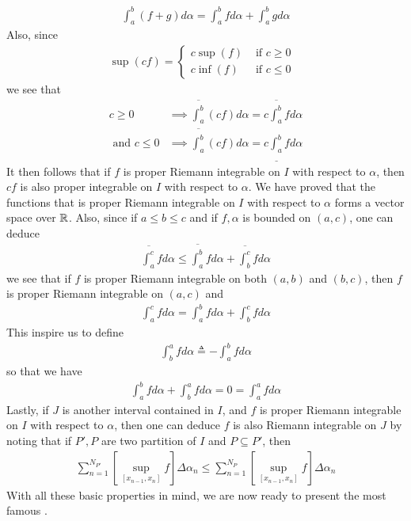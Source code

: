 \documentclass{report}
\begin{document}
\begin{mdframed}
\begin{align*}
\int_a^b (f+g)d\alpha = \int_a^b fd\alpha + \int_a^b gd\alpha 
\end{align*}
Also, since 
\begin{align*}
\sup  (cf)=\begin{cases}
  c\sup (f) & \text{ if $c\geq 0$ }\\
  c\inf (f)& \text{ if $c\leq 0$ }
\end{cases}
\end{align*}
we see that 
\begin{align*}
  c\geq 0 &\implies  \overline{\int_a^b}(cf)d\alpha = c\overline{\int_a^b}fd\alpha   \\
  \text{ and }c\leq 0&\implies  \overline{\int_a^b}(cf)d\alpha = c\underline{\int_a^b}fd\alpha  
\end{align*}
It then follows that if $f$ is proper Riemann integrable on $I$ with respect to $\alpha $, then $cf$ is also proper integrable on  $I$ with respect to  $\alpha $. We have proved that the functions that is proper Riemann integrable on $I$  with respect to $\alpha $ forms a vector space over $\mathbb{R}$. Also, since if $a\leq b\leq c$ and if  $f,\alpha $ is bounded on  $(a,c)$, one can deduce 
\begin{align*}
\overline{\int_a^c}fd\alpha \leq \overline{\int_a^b}fd\alpha  + \overline{\int_b^c}fd\alpha 
\end{align*}
we see that if $f$ is proper Riemann integrable on both  $(a,b)$ and $(b,c)$, then $f$ is proper Riemann integrable on $(a,c)$ and 
\begin{align*}
\int_a^c fd\alpha = \int_a^b fd\alpha + \int_b^c fd\alpha 
\end{align*}
This inspire us to define 
\begin{align*}
\int_b^a fd\alpha \triangleq -\int_a^b fd\alpha 
\end{align*}
so that we have 
\begin{align*}
\int_a^bfd\alpha +\int_b^a fd\alpha = 0= \int_a^a fd\alpha 
\end{align*}
Lastly, if $J$ is another interval contained in  $I$, and  $f$ is proper Riemann integrable on $I$ with respect to $\alpha$, then one can deduce $f$ is also Riemann integrable on $J$ by noting that if  $P',P$ are two partition of $I$  and $P\subseteq P'$, then 
\begin{align*}
  \sum_{n=1}^{N_{P'}} [\sup_{[x_{n-1},x_n]} f] \Delta \alpha _n \leq \sum_{n=1}^{N_P} [\sup_{[x_{n-1},x_n]} f] \Delta \alpha _n 
\end{align*}
With all these basic properties in mind, we are now ready to present the most famous . 
\end{mdframed}
\end{document}
